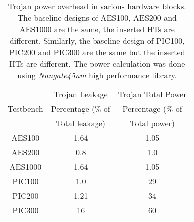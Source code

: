 \documentclass{beamer}
\begin{document}
\begin{columns}
\begin{column}[T]{0.33\textwidth}
                \begin{table}[h]
                            \begin{tabular}{c c c}
                                          & Trojan Leakage        & Trojan Total Power  \\
                                Testbench & Percentage (\% of     & Percentage (\% of \\
                                          & Total leakage)        & Total power) \\
                            \hline
                                AES100    & 1.64           & 1.05 \\
                                AES200    & 0.8            & 1.0 \\
                                AES1000   & 1.64           & 1.05 \\
                                PIC100    &1.0             & 29 \\
                                PIC200    & 1.21           & 34\\
                                PIC300    &16              & 60 \\
                            \end{tabular}
                            \caption{Trojan power overhead in various hardware
                            blocks. The baseline designs of AES100, AES200 and
                            AES1000 are the same, the inserted HTs are different.
                            Similarly, the baseline design of PIC100, PIC200 and
                            PIC300 are the same but the inserted HTs are different.
                            {\color{black}The power calculation was done using
                            \textit{Nangate45nm} high performance library.}}
                            \label{tab:power}
                \end{table}


\end{column}
\end{columns}
\end{document}
